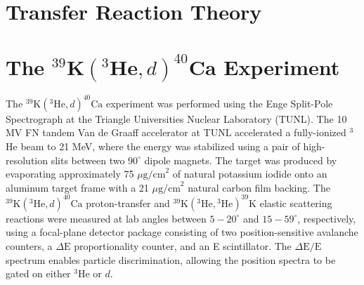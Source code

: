 



\section{Transfer Reaction Theory}


\section{The $^{39}\mathrm{\textbf{K}}(^{3}\mathrm{\textbf{He}},d)^{40}\mathrm{\textbf{Ca}}$ Experiment}










The $^{39}\mathrm{K}(^{3}\mathrm{He}, d)^{40}\mathrm{Ca}$ experiment was performed using the Enge Split-Pole Spectrograph at the Triangle Universities Nuclear Laboratory (TUNL). The 10 MV FN tandem Van de Graaff accelerator at TUNL accelerated a fully-ionized $^{3}$He beam to 21 MeV, where the energy was stabilized using a pair of high-resolution slits between two $90^{\circ}$ dipole magnets. The target was produced by evaporating approximately 75 $\mu\mathrm{g/cm}^{2}$ of natural potassium iodide onto an aluminum target frame with a 21 $\mu\mathrm{g/cm}^{2}$ natural carbon film backing. The $^{39}\mathrm{K}(^{3}\mathrm{He}, d)^{40}\mathrm{Ca}$ proton-transfer and $^{39}\mathrm{K}(^{3}\mathrm{He}, {}^{3}\mathrm{He})^{39}\mathrm{K}$ elastic scattering reactions were measured at lab angles between $5-20^{\circ}$ and $15-59^{\circ}$, respectively, using a focal-plane detector package \cite{Marshall2019} consisting of two position-sensitive avalanche counters, a $\Delta\mathrm{E}$ proportionality counter, and an E scintillator. The $\Delta\mathrm{E}/\mathrm{E}$ spectrum enables particle discrimination, allowing the position spectra to be gated on either $^{3}\mathrm{He}$ or $d$.

